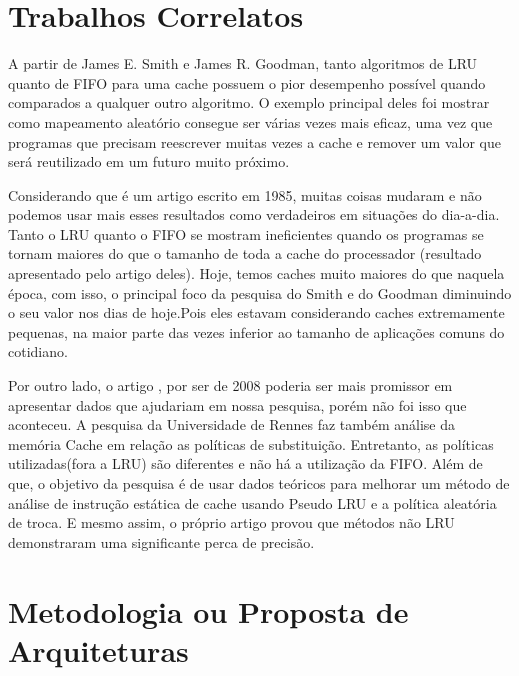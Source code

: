 \documentclass[conference]{IEEEtran}
\begin{document}
\section{Trabalhos Correlatos}


A partir de James E. Smith e James R. Goodman\cite{b1}, tanto algoritmos de LRU quanto de FIFO para
uma cache possuem o pior desempenho possível quando comparados a qualquer outro algoritmo. 
O exemplo principal deles foi mostrar como mapeamento aleatório consegue ser várias vezes mais eficaz, 
uma vez que programas que precisam reescrever muitas vezes a cache e remover um valor que será reutilizado 
em um futuro muito próximo.

Considerando que é um artigo escrito em 1985, muitas coisas mudaram e não podemos usar mais esses resultados
como verdadeiros em situações do dia-a-dia. Tanto o LRU quanto o FIFO se mostram ineficientes quando
os programas se tornam maiores do que o tamanho de toda a cache do processador (resultado apresentado pelo artigo
deles). Hoje, temos caches muito maiores do que naquela época, com isso, o principal foco da pesquisa do Smith e 
do Goodman diminuindo o seu valor nos dias de hoje.Pois eles estavam considerando caches extremamente pequenas, na maior 
parte das vezes inferior ao tamanho de aplicações comuns do cotidiano.

Por outro lado, o artigo \cite{b2}, por ser de 2008 poderia ser mais promissor em apresentar 
dados que ajudariam em nossa pesquisa, porém não foi isso que aconteceu. A pesquisa da Universidade de 
Rennes faz também análise da memória Cache em relação as políticas de substituição. Entretanto, as políticas 
utilizadas(fora a LRU) são diferentes e não há a utilização da FIFO. Além de que, o objetivo da pesquisa é de usar 
dados teóricos para melhorar um método de análise de instrução estática de cache usando Pseudo LRU e a política 
aleatória de troca. E mesmo assim, o próprio artigo provou que métodos não LRU demonstraram uma significante perca de precisão.

\section{Metodologia ou Proposta de Arquiteturas}
\end{document}
